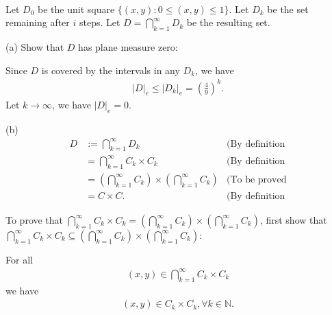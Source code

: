 \documentclass[UTF8,a4paper,10pt]{article}
\begin{document}
  \begin{solution}\,\\
    Let \(D_0\) be the unit square \(\{(x,y): 0\leq (x,y)\leq 1\}\). Let \(D_k\) be the set remaining after \(i\) steps. Let \(D = \bigcap_{k=1}^{\infty} D_k \) be the resulting set.

  

    (a) Show that \(D\) has plane measure
    zero:

    Since \(D\) is covered by the intervals in any \(D_k\), we have
    \begin{equation*}
      \begin{aligned}
        \left\lvert D\right\rvert_e \leq \left\lvert D_k \right\rvert_e = \left(\frac{4}{9}\right)^{k}.
      \end{aligned}
    \end{equation*}
    Let \(k\to\infty\), we have \(\left\lvert D\right\rvert_e = 0\).


    (b)
    \begin{equation*}
      \begin{aligned}
        D &:= \bigcap_{k=1}^{\infty} D_k &\text{(By definition}\\
        &= \bigcap_{k=1}^{\infty} C_k \times C_k &\text{(By definition}\\
        &=  \left(\bigcap_{k=1}^{\infty} C_k\right) \times \left(\bigcap_{k=1}^{\infty} C_k\right) &\text{(To be proved}\\
        &= C\times C. &\text{(By definition}
      \end{aligned}
    \end{equation*}

    To prove that \(\bigcap_{k=1}^{\infty} C_k \times C_k = \left(\bigcap_{k=1}^{\infty} C_k\right) \times \left(\bigcap_{k=1}^{\infty} C_k\right)\), first show that \(\bigcap_{k=1}^{\infty} C_k \times C_k \subseteq \left(\bigcap_{k=1}^{\infty} C_k\right) \times \left(\bigcap_{k=1}^{\infty} C_k\right)\):

For all
    \begin{equation*}
      \begin{aligned}
          (x,y)\in\bigcap_{k=1}^{\infty} C_k \times C_k
      \end{aligned}
    \end{equation*}
    we have
    \begin{equation*}
      \begin{aligned}
        (x,y)\in C_k \times C_k, \forall k \in \mathbb{N}.
      \end{aligned}
    \end{equation*}


\end{solution}
\end{document}
